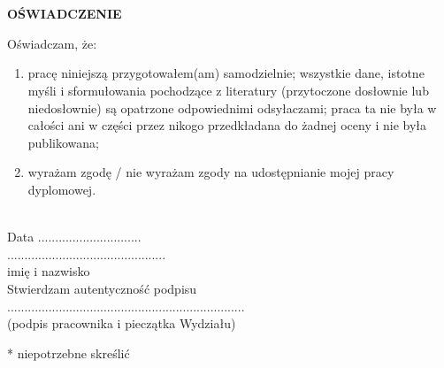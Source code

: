 \documentclass[12pt,a4paper,twoside,openright]{report}
\author{Karol Zygadło}
\begin{document}
    \begin{titlepage}
    
    \end{titlepage}
\begingroup
    \tableofcontents
    
    
    
    
    
    
    
    
\endgroup

\medskip
\printbibliography[type=online, title={Netografia\footnote{Podane adresy zostały odwiedzone w maju 2020 roku. Nie ma gwarancji, że po tej dacie będą dalej aktywne lub poprawne.}}]
\printbibliography[type=book, title={Bibliografia}]
\lstlistoflistings
\listoffigures
\listoftables

\newpage

\chapter*{}
\centering\textbf{OŚWIADCZENIE\\[6mm]}
\raggedright
Oświadczam, że: 
\begin{enumerate}
    \item pracę niniejszą przygotowałem(am) samodzielnie; wszystkie dane, istotne myśli i sformułowania pochodzące 
z literatury (przytoczone dosłownie lub niedosłownie) są opatrzone odpowiednimi odsyłaczami; praca ta nie była 
w całości ani w części przez nikogo przedkładana do żadnej oceny i nie była publikowana;
    \item wyrażam zgodę / nie wyrażam zgody na udostępnianie mojej pracy dyplomowej. 
\end{enumerate}\\[10mm]
Data ..............................\\[15mm]


\centering
\hspace{200pt} ..............................................\\[0mm]
\hspace{200pt} imię i nazwisko\\[10mm]
\hspace{200pt} Stwierdzam autentyczność podpisu\\[5mm]
\hspace{200pt} .....................................................................\\[0mm]
\hspace{200pt} (podpis  pracownika i pieczątka Wydziału)\\[20mm]
 
 \raggedright
 * niepotrzebne skreślić
\end{document}
